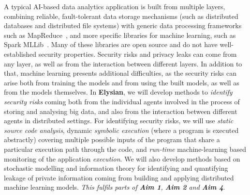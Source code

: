 \documentclass[a4paper,11pt]{article}
\newcommand{\project}[1]{\textbf{#1}\xspace}
\newcommand{\SECURITY}{\project{Elysian}}
\newcommand{\TheProject}{\SECURITY}
\begin{document}
A typical AI-based data analytics application is built from multiple layers, combining reliable, fault-tolerant data storage mechanisms (such as distributed databases and distributed file systems) with generic data processing frameworks such as MapReduce~\cite{mapreduce}, and more specific libraries for machine learning, such as Spark MLLib~\cite{mllib}. Many of these libraries are open source and do not have well-established security properties. Security risks and privacy leaks can come from any layer, as well as from the interaction between different layers. In addition to that, machine learning presents additional difficulties, as the security risks can arise both from training the models and from using the built models, as well as from the models themselves. In \TheProject{},  we will develop methods to \emph{identify security risks} coming both from the individual agents involved in the process of storing and analysing big data, and also from the interaction between different agents in distributed settings. For identifying security risks, we will use \emph{static source code analysis}, dynamic \emph{symbolic execution} (where a program is executed abstractly) covering multiple possible inputs of the program that share a particular execution path through the code, and \emph{run-time} machine-learning based monitoring of the application \emph{execution}. We will also develop methods based on stochastic modelling and information theory for identifying and quantifying leakage of private information coming from building and applying distributed machine learning models. \emph{This fulfils parts of \textbf{Aim 1}, \textbf{Aim 2} and \textbf{Aim 4}}.
\end{document}
